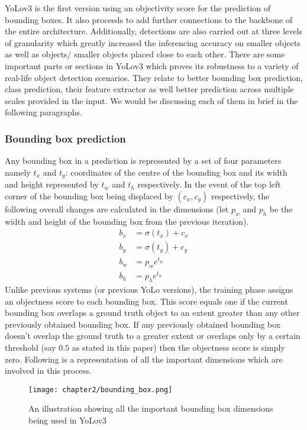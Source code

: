 YoLov3 is the first version using an objectivity score for the prediction of bounding boxes. It also proceeds to add further connections to the backbone of the entire architecture. Additionally, detections are also carried out at three levels of granularity which greatly increased the inferencing accuracy on smaller objects as well as objects/ smaller objects placed close to each other. There are some important parts or sections in YoLov3 which proves its robustness to a variety of real-life object detection scenarios. They relate to better bounding box prediction, class prediction, their feature extractor as well better prediction across multiple scales provided in the input. We would be discussing each of them in brief in the following paragraphs. \par

\subsubsection{Bounding box prediction}
Any bounding box in a prediction is represented by a set of four parameters namely $t_x$ and $t_y$: coordinates of the centre of the bounding box and its width and height represented by $t_w$ and $t_h$ respectively. In the event of the top left corner of the bounding box being displaced by $(c_x,c_y)$ respectively, the following overall changes are calculated in the dimensions (let $p_w$ and $p_h$ be the width and height of the bounding box from the previous iteration).
\begin{align*}
b_x &=  \sigma(t_x) + c_x \\
b_y &=  \sigma(t_y) + c_y \\
b_w &=  {p_w}e^{t_w} \\
b_h &=  {p_h}e^{t_h}
\end{align*}
Unlike previous systems (or previous YoLo versions), the training phase assigns an objectness score to each bounding box. This score equals one if the current bounding box overlaps a ground truth object to an extent greater than any other previously obtained bounding box. If any previously obtained bounding box doesn’t overlap the ground truth to a greater extent or overlaps only by a certain threshold (say $0.5$ as stated in this paper) then the objectness score is simply zero. Following is a representation of all the important dimensions which are involved in this process.

\begin{figure}
  \centering
  \texttt{[image: chapter2/bounding\_box.png]}
  \caption{An illustration showing all the important bounding box dimensions being used in YoLov3}
  \label{fig:bbox}
\end{figure}

